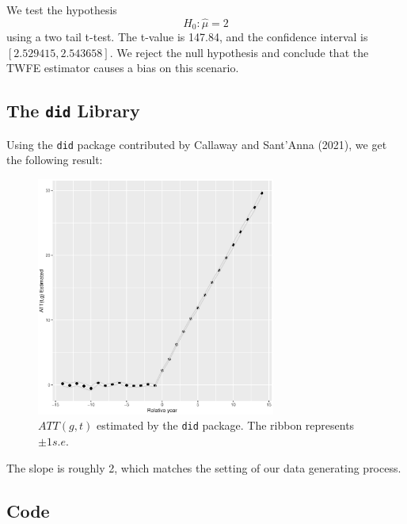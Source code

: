 We test the hypothesis
\begin{equation*}
    H_0 : \hat{\mu} = 2
\end{equation*}
using a two tail t-test. The t-value is 147.84, and the confidence interval is $[2.529415,2.543658]$. 
We reject the null hypothesis and conclude that the TWFE estimator causes a bias on this scenario.


\subsection{The \texttt{did} Library}
Using the \verb|did| package contributed by Callaway and Sant’Anna (2021), we get the following result:

\begin{figure}[h]
    \centering
    \includegraphics[width=0.7\textwidth]{fig/did_package_result.eps}
    \caption{$ATT(g,t)$ estimated by the \texttt{did} package. The ribbon represents $\pm 1 s.e$.}
\end{figure}

The slope is roughly 2, which matches the setting of our data generating process.

\newpage
\subsection{Code}
